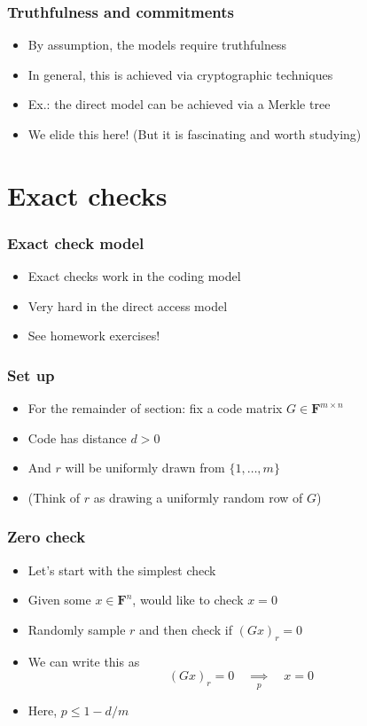 \documentclass{beamer}
\newcommand{\field}{\mathbf{F}}
\newcommand{\impliesn}[1]{\underset{#1}{\implies}}
\newcommand{\impliesp}{\impliesn{p}}
\begin{document}
    \begin{frame}
        \frametitle{Truthfulness and commitments}
        \begin{itemize}\itemsep=12pt
            \item By assumption, the models require truthfulness
            \item In general, this is achieved via cryptographic techniques
            \item Ex.: the direct model can be achieved via a Merkle tree
            \item We elide this here! (But it is fascinating and worth studying)
        \end{itemize}
    \end{frame}

    \section{Exact checks}
    \begin{frame}
        \frametitle{Exact check model}
        \begin{itemize}\itemsep=12pt
            \item Exact checks work in the coding model
            \item Very hard in the direct access model
            \pause
            \item See homework exercises!
        \end{itemize}
    \end{frame}

    \begin{frame}
        \frametitle{Set up}
        \begin{itemize}\itemsep=12pt
            \item For the remainder of section: fix a code matrix $G \in \field^{m \times n}$
            \item Code has distance $d > 0$
            \item And $r$ will be uniformly drawn from $\{1,\dots, m\}$
            \item (Think of $r$ as drawing a uniformly random row of $G$)
        \end{itemize}
    \end{frame}

    \begin{frame}
        \frametitle{Zero check}
        \begin{itemize}\itemsep=12pt
            \item Let's start with the simplest check
            \item Given some $x \in \field^n$, would like to check $x = 0$
            \pause
            \item Randomly sample $r$ and then check if $(Gx)_r = 0$
            \pause
            \item We can write this as
            \[
                (Gx)_r = 0 \quad \impliesp \quad x = 0
            \]
            \item Here, $p \le 1 - d/m$
        \end{itemize}
    \end{frame}
\end{document}
